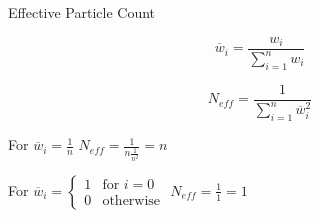 \documentclass{beamer}
\begin{document}

\begin{frame}{Effective Particle Count}

\begin{equation}
\overline{w}_{i} = \frac{w_{i}}{\sum_{i=1}^{n} w_{i}}
\end{equation}

\vspace{0.2cm}

\begin{equation}
N_{eff} = \frac{1}{\sum_{i=1}^{n} \overline{w}_{i}^2}
\end{equation}

\vspace{1cm}

\begin{center}

For \hspace{0.3cm} \(\overline{w}_{i}=\frac{1}{n}\) \hspace{2.4cm} \(N_{eff} = \frac{1}{n\frac{1}{n^2}} = n \)

\vspace{1cm}

For \hspace{0.3cm} \(
\overline{w}_{i} = \begin{cases}

  1 & \text{for $i=0$} \\

  0 & \text{otherwise}

\end{cases}
\)\hspace{0.4cm} \(N_{eff} = \frac{1}{1} = 1 \)

\end{center}

\end{frame}

\end{document}
